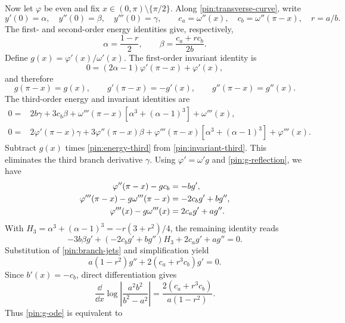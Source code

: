 Now let $\varphi$ be even and fix
$x\in(0,\pi)\setminus\{\pi/2\}$. Along
\eqref{pin:transverse-curve}, write
\[
 y'(0)=\alpha,\quad y''(0)=\beta,\quad y'''(0)=\gamma,
 \qquad c_a=\omega''(x),\quad c_b=\omega''(\pi-x),\quad r=a/b.
\]
The first- and second-order energy identities give, respectively,
\begin{equation}
                    \alpha=\frac{1-r}{2},\qquad
                    \beta=\frac{c_a+r c_b}{2b}.
 \label{pin:branch-jets}
\end{equation}
Define $g(x)=\varphi'(x)/\omega'(x)$. The first-order invariant
identity is
\[
                   0=(2\alpha-1)\varphi'(\pi-x)+\varphi'(x),
\]
and therefore
\begin{equation}
       g(\pi-x)=g(x),\qquad
       g'(\pi-x)=-g'(x),\qquad g''(\pi-x)=g''(x).
 \label{pin:g-reflection}
\end{equation}
The third-order energy and invariant identities are
\begin{align}
 0={}&2b\gamma+3c_b\beta
   +\omega'''(\pi-x)[\alpha^3+(\alpha-1)^3]+\omega'''(x),
 \label{pin:energy-third}\\
 0={}&2\varphi'(\pi-x)\gamma+3\varphi''(\pi-x)\beta
   +\varphi'''(\pi-x)[\alpha^3+(\alpha-1)^3]+\varphi'''(x).
 \label{pin:invariant-third}
\end{align}
Subtract $g(x)$ times \eqref{pin:energy-third} from
\eqref{pin:invariant-third}. This eliminates the third branch
derivative $\gamma$. Using $\varphi'=\omega'g$ and
\eqref{pin:g-reflection}, we have
\begin{align}
 \varphi''(\pi-x)-gc_b&=-bg',\notag\\
 \varphi'''(\pi-x)-g\omega'''(\pi-x)&=-2c_b g'+bg'',\notag\\
 \varphi'''(x)-g\omega'''(x)&=2c_a g'+ag''.
 \label{pin:third-subtraction}
\end{align}
With $H_3=\alpha^3+(\alpha-1)^3=-r(3+r^2)/4$, the remaining
identity reads
\[
             -3b\beta g'+(-2c_bg'+bg'')H_3+2c_ag'+ag''=0.
\]
Substitution of \eqref{pin:branch-jets} and simplification yield
\begin{equation}
                  a(1-r^2)g''+2(c_a+r^3c_b)g'=0.
 \label{pin:g-ode}
\end{equation}
Since $b'(x)=-c_b$, direct differentiation gives
\begin{equation}
 \frac{\dd}{\dd x}\log\left|\frac{a^2b^2}{b^2-a^2}\right|
        =\frac{2(c_a+r^3c_b)}{a(1-r^2)}.
 \label{pin:integrating-factor}
\end{equation}
Thus \eqref{pin:g-ode} is equivalent to
